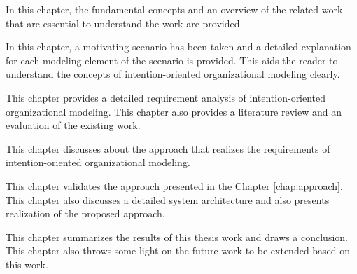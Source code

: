 \begin{description} [labelwidth = 0.07\textwidth]
	\item[Chapter ~\ref{chap:fundamentals} -- \nameref{chap:fundamentals}:] In this chapter, the fundamental concepts and an overview of the related work that are essential to understand the work are provided.
	\item[Chapter ~\ref{chap:motivatingScenario} -- \nameref{chap:motivatingScenario}:] In this chapter, a motivating scenario has been taken and a detailed explanation for each modeling element of the scenario is provided. This aids the reader to understand the concepts of intention-oriented organizational modeling clearly. 
	\item [Chapter ~\ref{chap:analysis} -- \nameref{chap:analysis}:] This chapter provides a detailed requirement analysis of intention-oriented organizational modeling. This chapter also provides a literature review and an evaluation of the existing work.
	\item[Chapter ~\ref{chap:approach} -- \nameref{chap:approach}:] This chapter discusses about the approach that realizes the requirements of intention-oriented organizational modeling.
	\item[Chapter ~\ref{chap:casestudy} -- \nameref{chap:casestudy}:] This chapter validates the approach presented in the Chapter \ref{chap:approach}. This chapter also discusses a detailed system architecture and also presents realization of the proposed approach. 	
	\item[Chapter ~\ref{chap:conclusion} -- \nameref{chap:conclusion}:] This chapter summarizes the results of this thesis work and draws a conclusion. This chapter also throws some light on the future work to be extended based on this work. 
\end{description}